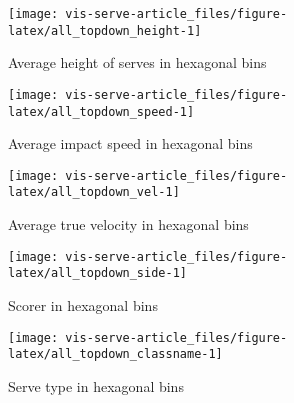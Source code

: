 \documentclass[article]{jss}
\begin{document}
\begin{CodeChunk}
\begin{figure}

{\centering \texttt{[image: vis-serve-article\_files/figure-latex/all\_topdown\_height-1]} 

}

\caption[Average height of serves in hexagonal bins]{Average height of serves in hexagonal bins}\label{fig:all_topdown_height}
\end{figure}
\end{CodeChunk}

\begin{CodeChunk}
\begin{figure}

{\centering \texttt{[image: vis-serve-article\_files/figure-latex/all\_topdown\_speed-1]} 

}

\caption[Average impact speed in hexagonal bins]{Average impact speed in hexagonal bins}\label{fig:all_topdown_speed}
\end{figure}
\end{CodeChunk}

\begin{CodeChunk}
\begin{figure}

{\centering \texttt{[image: vis-serve-article\_files/figure-latex/all\_topdown\_vel-1]} 

}

\caption[Average true velocity in hexagonal bins]{Average true velocity in hexagonal bins}\label{fig:all_topdown_vel}
\end{figure}
\end{CodeChunk}

\begin{CodeChunk}
\begin{figure}

{\centering \texttt{[image: vis-serve-article\_files/figure-latex/all\_topdown\_side-1]} 

}

\caption[Scorer in hexagonal bins]{Scorer in hexagonal bins}\label{fig:all_topdown_side}
\end{figure}
\end{CodeChunk}

\begin{CodeChunk}
\begin{figure}

{\centering \texttt{[image: vis-serve-article\_files/figure-latex/all\_topdown\_classname-1]} 

}

\caption[Serve type in hexagonal bins]{Serve type in hexagonal bins}\label{fig:all_topdown_classname}
\end{figure}
\end{CodeChunk}
\end{document}
